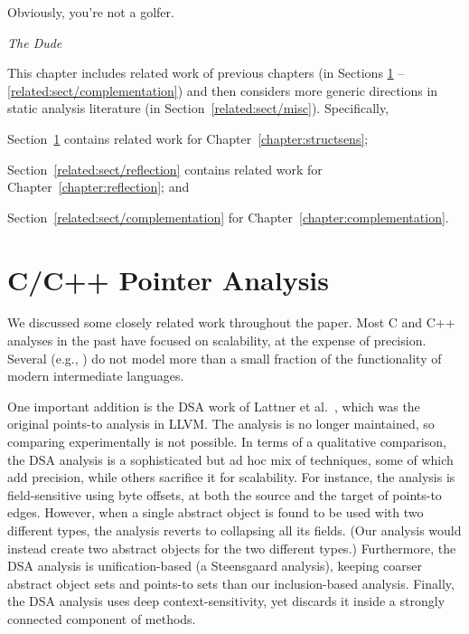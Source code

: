 \epigraph{Obviously, you're not a golfer.}{\textit{The Dude}}

This chapter includes related work of previous chapters (in Sections
\ref{related:sect/structsens} -- \ref{related:sect/complementation})
and then considers more generic directions in static analysis
literature (in Section~\ref{related:sect/misc}).
%
Specifically,
\begin{inparaenum}[(i)]
\item Section~\ref{related:sect/structsens} contains related work for
  Chapter~\ref{chapter:structsens};
\item Section~\ref{related:sect/reflection} contains related work for
  Chapter~\ref{chapter:reflection}; and
\item Section~\ref{related:sect/complementation} for
  Chapter~\ref{chapter:complementation}.
\end{inparaenum}

\section{C/C++ Pointer Analysis}
\label{related:sect/structsens}

We discussed some closely related work throughout the paper. Most C
and C++ analyses in the past have focused on scalability, at the
expense of precision. Several (e.g.,
\cite{antgrasshopper,popl/ZhengR08,popl/Lhotak11}) do not model more
than a small fraction of the functionality of modern intermediate
languages.

One important addition is the DSA work of Lattner et
al.~\cite{pldi/LattnerLA07}, which was the original points-to analysis
in LLVM. The analysis is no longer maintained, so comparing
experimentally is not possible. In terms of a qualitative comparison,
the DSA analysis is a sophisticated but ad hoc mix of techniques, some
of which add precision, while others sacrifice it for scalability. For
instance, the analysis is field-sensitive using byte offsets, at both
the source and the target of points-to edges. However, when a single
abstract object is found to be used with two different types, the
analysis reverts to collapsing all its fields. (Our analysis would
instead create two abstract objects for the two different types.)
Furthermore, the DSA analysis is unification-based (a Steensgaard
analysis), keeping coarser abstract object sets and points-to sets
than our inclusion-based analysis. Finally, the DSA analysis uses deep
context-sensitivity, yet discards it inside a strongly connected
component of methods.

